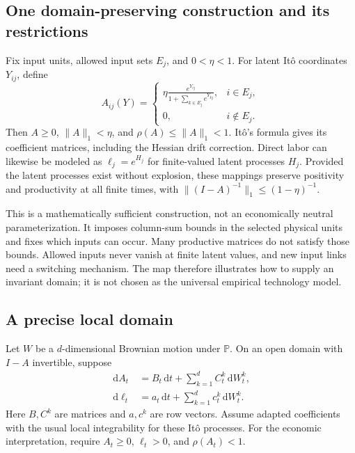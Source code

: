 \documentclass[11pt,letterpaper]{article}
\newcommand{\Pp}{\mathbb P}
\newcommand{\dd}{\,\mathrm d}
\begin{document}
\subsection{One domain-preserving construction and its restrictions}
Fix input units, allowed input sets $E_j$, and $0<\eta<1$. For latent
It\^o coordinates $Y_{ij}$, define
\begin{equation}\label{eq:admissible-technology}
 A_{ij}(Y)=
 \begin{cases}
 \displaystyle\eta\frac{e^{Y_{ij}}}
               {1+\sum_{k\in E_j}e^{Y_{kj}}},&i\in E_j,\\[6pt]
 0,&i\notin E_j.
 \end{cases}
\end{equation}
Then $A\ge0$, $\|A\|_1<\eta$, and
$\rho(A)\le\|A\|_1<1$. It\^o's formula gives its coefficient matrices,
including the Hessian drift correction. Direct labor can likewise be
modeled as $\ell_j=e^{H_j}$ for finite-valued latent processes $H_j$.
Provided the latent processes exist without explosion, these mappings
preserve positivity and productivity at all finite times, with
$\|(I-A)^{-1}\|_1\le(1-\eta)^{-1}$.

This is a mathematically sufficient construction, not an economically
neutral parameterization. It imposes column-sum bounds in the selected
physical units and fixes which inputs can occur. Many productive matrices
do not satisfy those bounds. Allowed inputs never vanish at finite
latent values, and new input links need a switching mechanism.
The map therefore illustrates how to supply an invariant domain; it is
not chosen as the universal empirical technology model.

\subsection{A precise local domain}
Let $W$ be a $d$-dimensional Brownian motion under $\Pp$. On an open
domain with $I-A$ invertible, suppose
\begin{equation}\label{eq:coefficients}
\begin{aligned}
 \dd A_t&=B_t\dd t+\sum_{k=1}^d C_t^k\dd W_t^k,\\
 \dd\ell_t&=a_t\dd t+\sum_{k=1}^d c_t^k\dd W_t^k.
\end{aligned}
\end{equation}
Here $B,C^k$ are matrices and $a,c^k$ are row vectors. Assume adapted
coefficients with the usual local integrability for these It\^o
processes. For the economic interpretation, require $A_t\ge0$,
$\ell_t>0$, and $\rho(A_t)<1$.
\end{document}
